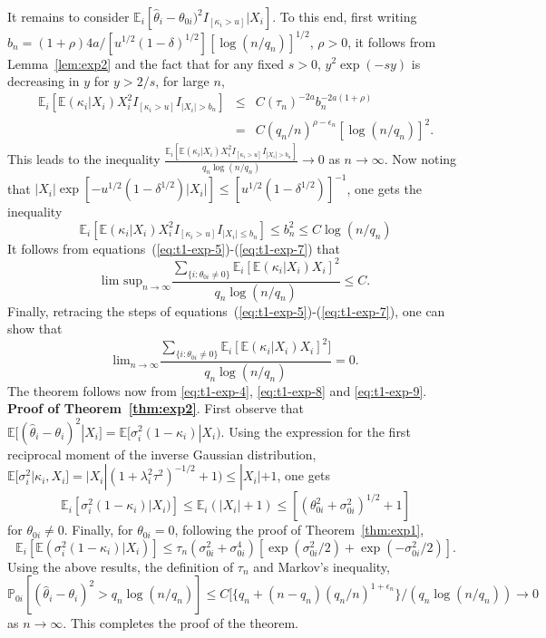 \documentclass[sn-basic]{sn-jnl}%
\theoremstyle{thmstyleone}%
\begin{document}
\noindent
It remains to consider  $\mathbb{E}_i[\hat{\theta}_i-\theta_{0i})^2 I_{[\kappa_i>u]}|X_i]$.
To this end, first writing $b_n=(1+\rho)4a/[u^{1/2}(1-\delta)^{1/2}]
[\log(n/q_n)]^{1/2}$, $\rho>0$, it follows from Lemma~\ref{lem:exp2} and the 
fact that for any fixed $s>0$,  $y^2\exp(-sy)$  
is decreasing in $y$ for $y>2/s$, for large $n$,
\begin{eqnarray}
\mathbb{E}_i[\mathbb{E}(\kappa_i|X_i)X_i^2 
I_{[\kappa_i>u]}I_{|X_i|>b_n}] &\leq&  C(\tau_n)^{-2a} b_n^{-2a(1+\rho)}
 \nonumber\\ & = &
C(q_n/n)^{\rho-\epsilon_n}[\log(n/q_n)]^2.
\label{eq:t1-exp-6}
\end{eqnarray}
This leads to the inequality 
$\frac{\mathbb{E}_i[\mathbb{E}(\kappa_i|X_i)X_i^2 
I_{[\kappa_i>u]}I_{|X_i|>b_n}]}{q_n\log(n/q_n)}\rightarrow 0$ as 
$n\rightarrow\infty$.
Now noting that $|X_i|\exp[-u^{1/2}(1-\delta^{1/2})|X_i|]\leq
[u^{1/2}(1-\delta^{1/2})]^{-1}$, one gets the inequality
\begin{equation}
\mathbb{E}_i[\mathbb{E}(\kappa_i|X_i)X_i^2 I_{[\kappa_i>u]}I_{|X_i|\leq b_n}]
\leq b_n^2\leq C\log(n/q_n)
\label{eq:t1-exp-7}
\end{equation}
It follows from equations~(\ref{eq:t1-exp-5})-(\ref{eq:t1-exp-7}) that
\begin{equation}
\mbox{lim sup}_{n\rightarrow\infty}
\frac{\sum_{\{i:\theta_{0i}\neq 0\}}\mathbb{E}_i[\mathbb{E}(\kappa_i|X_i)X_i]^2}
{q_n\log(n/q_n)}\leq C.
\label{eq:t1-exp-8}
\end{equation}
Finally, retracing the steps of equations~(\ref{eq:t1-exp-5})-(\ref{eq:t1-exp-7}), one can show that
\begin{equation}
\mbox{lim}_{n\rightarrow\infty}
\frac{\sum_{\{i:\theta_{0i}\neq 0\}}\mathbb{E}_i[\mathbb{E}(\kappa_i|X_i)X_i]^2]}
{q_n\log(n/q_n)}=0.
\label{eq:t1-exp-9}
\end{equation}
The theorem follows now from \eqref{eq:t1-exp-4}, \eqref{eq:t1-exp-8} and \eqref{eq:t1-exp-9}.\\

\noindent
\textbf{Proof of Theorem~\ref{thm:exp2}}. First observe that $\mathbb{E}[(\hat{\theta}_i-\theta_i)^2|X_i]=
\mathbb{E}[\sigma_{i}^2(1-\kappa_i)|X_i)$. Using the expression for the first
reciprocal moment of the inverse Gaussian distribution, 
$\mathbb{E}[\sigma_i^2|\kappa_i,X_i]=|X_i|(1+\lambda_i^2\tau^2)^{-1/2}+1)\leq|X_i|+1$, 
one gets
\[
\mathbb{E}_i[\sigma_{i}^2(1-\kappa_i)|X_i)]\leq \mathbb{E}_i(|X_i|+1)\leq
[(\theta_{0i}^2+\sigma_{0i}^2)^{1/2}+1]
\]
for $\theta_{0i}\neq 0$. Finally, for $\theta_{0i}=0$, following the
proof of Theorem~\ref{thm:exp1}, 
\begin{equation}
\mathbb{E}_i[\mathbb{E}(\sigma_{i}^2(1-\kappa_i)|X_i)]\leq\tau_n(\sigma_{0i}^2+\sigma_{0i}^4)
[\exp(\sigma_{0i}^2/2)+\exp(-\sigma_{0i}^2/2)].
\label{eq:t2-exp-1}
\end{equation}
Using the above results, the definition of $\tau_n$ and Markov's inequality,
$\mathbb{P}_{0i}[(\hat{\theta}_i-\theta_i)^2>q_n\log(n/q_n)]\leq 
C[\{q_n+(n-q_n)(q_n/n)^{1+\epsilon_n}\}/(q_n\log(n/q_n))\rightarrow 0$
as $n\rightarrow\infty$. This completes the proof of the theorem.\\
\end{document}
